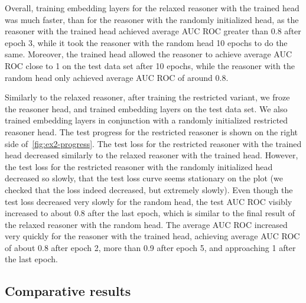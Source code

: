 Overall, training embedding layers for the relaxed reasoner with the trained head was much faster, than for the reasoner with the randomly initialized head, as the reasoner with the trained head achieved average AUC ROC greater than 0.8 after epoch 3, while it took the reasoner with the random head 10 epochs to do the same.
Moreover, the trained head allowed the reasoner to achieve average AUC ROC close to 1 on the test data set after 10 epochs, while the reasoner with the random head only achieved average AUC ROC of around 0.8. 

Similarly to the relaxed reasoner, after training the restricted variant, we froze the reasoner head, and trained embedding layers on the test data set.
We also trained embedding layers in conjunction with a randomly initialized restricted reasoner head.
The test progress for the restricted reasoner is shown on the right side of~\autoref{fig:ex2-progress}.
The test loss for the restricted reasoner with the trained head decreased similarly to the relaxed reasoner with the trained head.
However, the test loss for the restricted reasoner with the randomly initialized head decreased so slowly, that the test loss curve seems stationary on the plot (we checked that the loss indeed decreased, but extremely slowly).
Even though the test loss decreased very slowly for the random head, the test AUC ROC visibly increased to about 0.8 after the last epoch, which is similar to the final result of the relaxed reasoner with the random head. 
The average AUC ROC increased very quickly for the reasoner with the trained head, achieving average AUC ROC of about 0.8 after epoch 2, more than 0.9 after epoch 5, and approaching 1 after the last epoch. 



\subsection{Comparative results}

